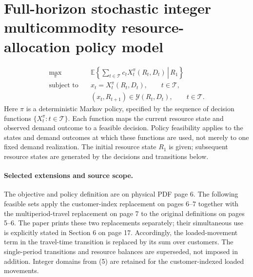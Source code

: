 \documentclass{article}
\begin{document}
\section*{Full-horizon stochastic integer multicommodity resource-allocation policy model}

\begin{align*}
\max_{\pi}\quad &\mathbb{E}\left\{\left.\sum_{t\in\mathcal{T}}c_tX_t^{\pi}(R_t,D_t)\,\right|\,R_1\right\}\\
\text{subject to}\quad
&x_t=X_t^{\pi}(R_t,D_t),\qquad t\in\mathcal{T},\\
&(x_t,R_{t+1})\in\mathcal{Y}(R_t,D_t),\qquad t\in\mathcal{T}.
\end{align*}
Here \(\pi\) is a deterministic Markov policy, specified by the sequence of decision functions \(\{X_t^{\pi}:t\in\mathcal{T}\}\). Each function maps the current resource state and observed demand outcome to a feasible decision. Policy feasibility applies to the states and demand outcomes at which these functions are used, not merely to one fixed demand realization. The initial resource state \(R_1\) is given; subsequent resource states are generated by the decisions and transitions below.

\paragraph{Selected extensions and source scope.}
The objective and policy definition are on physical PDF page 6. The following feasible sets apply the customer-index replacement on pages 6--7 together with the multiperiod-travel replacement on page 7 to the original definitions on pages 5--6. The paper prints these two replacements separately; their simultaneous use is explicitly stated in Section 6 on page 17. Accordingly, the loaded-movement term in the travel-time transition is replaced by its sum over customers. The single-period transitions and resource balances are superseded, not imposed in addition. Integer domains from (5) are retained for the customer-indexed loaded movements.
\end{document}
